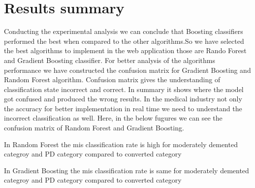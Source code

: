 \documentclass[conference]{IEEEtran}
\begin{document}
 
 
 
 

\section{Results summary}
Conducting the experimental analysis we can conclude that Boosting classifiers performed the best when compared to the other algorithms.So we have selected the best algorithms to implement in the web application those are Rando Forest and Gradient Boosting classifier. For better analysis of the algorithms performance we have constructed the confusion matrix for Gradient Boosting and Random Forest algorithm.
Confusion matrix gives the understanding of classification state incorrect and correct. In summary it shows where the model got confused and produced the wrong results. In the medical industry not only the accuracy for better implementation in real time we need to understand the incorrect classification as well.
Here, in the below fugures we can see the confusion matrix of Random Forest and Gradient Boosting.

In Random Forest the mis classification rate is high for moderately demented categroy and PD category compared to converted category

In Gradient Boosting  the mis classification rate is same for moderately demented categroy and PD category compared to converted category


\newpage{}


\end{document}
